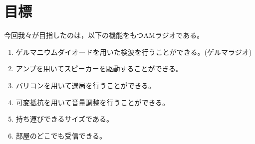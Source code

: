 \documentclass[report.tex]{subfiles}
\begin{document}
\section{目標}


今回我々が目指したのは，以下の機能をもつAMラジオである。
\begin{enumerate}
  \item ゲルマニウムダイオードを用いた検波を行うことができる。(ゲルマラジオ)
  \item アンプを用いてスピーカーを駆動することができる。
  \item バリコンを用いて選局を行うことができる。
  \item 可変抵抗を用いて音量調整を行うことができる。
  \item 持ち運びできるサイズである。
  \item 部屋のどこでも受信できる。
\end{enumerate}
\end{document}
